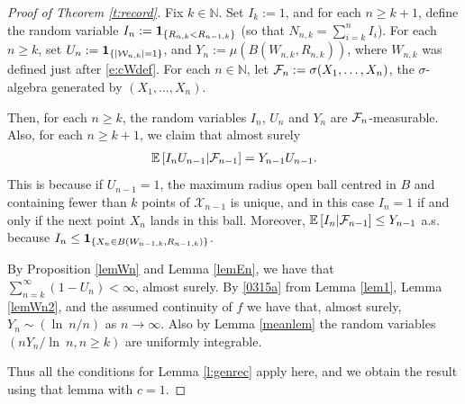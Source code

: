 \documentclass[12pt]{article}
\newcommand{\N}{\mathbb{N}}
\newcommand{\cW}{\mathcal{W}}
\newcommand{\X}{\mathcal{X}}
\newcommand{\E}{\mathbb E \,}
\newcommand{\F}{{\cal F}}
\renewcommand{\log}{{\ln \:}}
\begin{document}
\begin{proof}[Proof of Theorem \ref{t:record}]
	Fix $k \in \N$.
	Set $I_k := 1$, and for each $n \geq k+1$,
	define the random variable 
	$I_n:= {\bf 1}_{\{R_{n,k} < R_{n-1,k}\}}$
	(so that $N_{n,k} = \sum_{i = k}^n I_i$).
	For each $n \geq k$,
	set $U_n := {\bf 1}_{ \{|\cW_{n,k}|=1\}}$, and
	$Y_n:= \mu(B(W_{n,k},R_{n,k}))$, where $W_{n,k} $ was defined
	just after \eqref{e:cWdef}.
	For each $n \in \N$, let $\F_n := \sigma(X_1,\ldots,X_n)$,
	  the $\sigma$-algebra generated by $(X_1,\ldots,X_n)$.

  Then, for each $n \geq k$, the random variables $I_n $, $U_n $ and
	$Y_n$ are  $\F_n$-measurable.
Also, for each $n \geq k+1$, we claim that almost surely
	\begin{align}
		\E [ I_n U_{n-1} | \F_{n-1} ] = Y_{n-1} U_{n-1}. 
		\label{0116c2}
	\end{align} 
	This is because if $U_{n-1} =1$, the
maximum radius open ball centred in $B$ and  
containing fewer than $k$
	points of $\X_{n-1}$ is unique, %
 and in this case $I_n = 1$ if and
only if the next point $X_n$ lands in this ball. Moreover,
	$\E[ I_n | \F_{n-1} ] \leq Y_{n-1} $ a.s.
	because
	$I_n \leq {\bf 1}_{\{X_n \in B(W_{n-1,k},R_{n-1,k}) \}}$.


	By Proposition \ref{lemWn}
	and Lemma \ref{lemEn}, we have that  $\sum_{n=k}^\infty (1-U_n)
	< \infty$, almost surely.
	By \eqref{0315a} from Lemma \ref{lem1}, Lemma \ref{lemWn2}, and the assumed continuity of
$f$ we have that, almost surely, $Y_n \sim (\log n/n)$ as $n \to \infty$.
	Also by Lemma \ref{meanlem} the
	random variables $(nY_n/\log n, n \geq k)$
are uniformly integrable.
	
	Thus all the conditions for
	Lemma \ref{l:genrec} apply here, and
	we  obtain the result using that lemma with $c=1$.
\end{proof}
\end{document}
